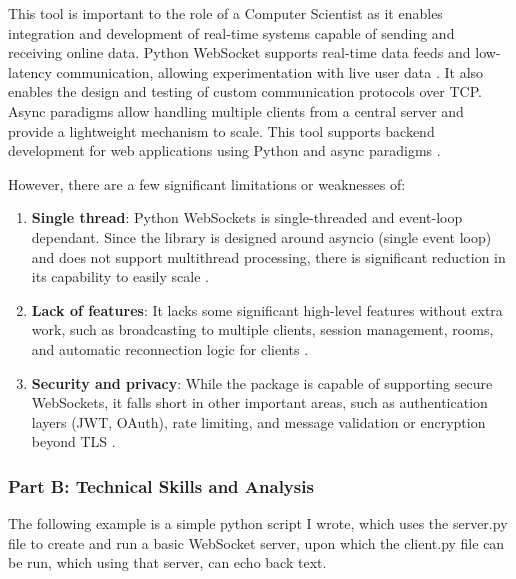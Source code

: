 \documentclass[a4paper, 11pt]{report}
\begin{document}
This tool is important to the role of a Computer Scientist as it enables integration and development of real-time systems capable of sending and receiving online data. Python WebSocket supports real-time data feeds and low-latency communication, allowing experimentation with live user data \cite{chatgpt2025}. It also enables the design and testing of custom communication protocols over TCP. Async paradigms allow handling multiple clients from a central server and provide a lightweight mechanism to scale. This tool supports backend development for web applications using Python and async paradigms \cite{obregon2023}.

However, there are a few significant limitations or weaknesses of:

\begin{enumerate}
    \item \textbf{Single thread}: Python WebSockets is single-threaded and event-loop dependant. Since the library is designed around asyncio (single event loop) and does not support multithread processing, there is significant reduction in its capability to easily scale \cite{pypi_websockets}.
    
    \item \textbf{Lack of features}: It lacks some significant high-level features without extra work, such as broadcasting to multiple clients, session management, rooms, and automatic reconnection logic for clients \cite{ably2023}.
    
    \item \textbf{Security and privacy}: While the package is capable of supporting secure WebSockets, it falls short in other important areas, such as authentication layers (JWT, OAuth), rate limiting, and message validation or encryption beyond TLS \cite{chatgpt2025}.
\end{enumerate}


\subsubsection{Part B: Technical Skills and Analysis}

The following example is a simple python script I wrote, which uses the server.py file to create and run a basic WebSocket server, upon which the client.py file can be run, which using that server, can echo back text. 
\end{document}

